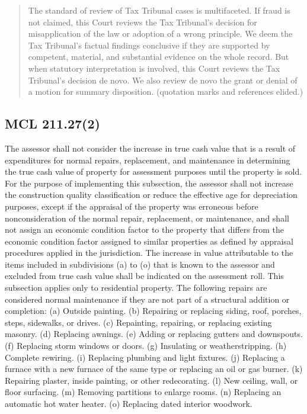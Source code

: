 \documentclass[12pt,\documentclassflag]{michiganCourtOfAppealsBrief}
\begin{document}
\begin{quote}
  The standard of review of Tax Tribunal cases is multifaceted. If fraud is not claimed, this Court reviews the Tax Tribunal's decision for misapplication of the law or adoption of a wrong principle. We deem the Tax Tribunal's factual findings conclusive if they are supported by competent, material, and substantial evidence on the whole record. But when statutory interpretation is involved, this Court reviews the Tax Tribunal's decision de novo. We also review de novo the grant or denial of a motion for summary disposition. (quotation marks and references elided.)
\end{quote}

\subsection{MCL 211.27(2)}
 
The assessor shall not consider the increase in true cash value that is a result of expenditures for normal repairs, replacement, and maintenance in determining the true cash value of property for assessment purposes until the property is sold. For the purpose of implementing this subsection, the assessor shall not increase the construction quality classification or reduce the effective age for depreciation purposes, except if the appraisal of the property was erroneous before nonconsideration of the normal repair, replacement, or maintenance, and shall not assign an economic condition factor to the property that differs from the economic condition factor assigned to similar properties as defined by appraisal procedures applied in the jurisdiction. The increase in value attributable to the items included in subdivisions (a) to (o) that is known to the assessor and excluded from true cash value shall be indicated on the assessment roll. This subsection applies only to residential property. The following repairs are considered normal maintenance if they are not part of a structural addition or completion:
(a) Outside painting. (b) Repairing or replacing siding, roof, porches, steps, sidewalks, or drives. (c) Repainting, repairing, or replacing existing masonry. (d) Replacing awnings. (e) Adding or replacing gutters and downspouts. (f) Replacing storm windows or doors. (g) Insulating or weatherstripping. (h) Complete rewiring. (i) Replacing plumbing and light fixtures. (j) Replacing a furnace with a new furnace of the same type or replacing an oil or gas burner. (k) Repairing plaster, inside painting, or other redecorating. (l) New ceiling, wall, or floor surfacing. (m) Removing partitions to enlarge rooms. (n) Replacing an automatic hot water heater. (o) Replacing dated interior woodwork.
 
\end{document}
